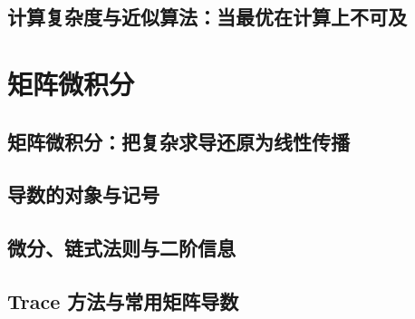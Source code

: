 \documentclass[UTF8,openany]{ctexbook}
\theoremstyle{definition}
\theoremstyle{plain}
\begin{document}
\chapter*{计算复杂度与近似算法：当最优在计算上不可及}
\label{ch:079}



\clearpage
\part{矩阵微积分}
\chapter*{矩阵微积分：把复杂求导还原为线性传播}
\label{ch:080}

\clearpage
\chapter*{导数的对象与记号}
\label{ch:081}



\clearpage
\chapter*{微分、链式法则与二阶信息}
\label{ch:082}




\clearpage
\chapter*{Trace 方法与常用矩阵导数}
\label{ch:083}




\clearpage
\end{document}
